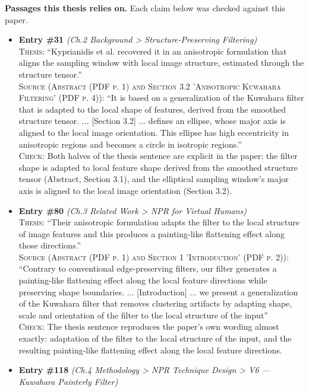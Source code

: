 \documentclass[11pt, a4paper]{article}
\begin{document}
\textbf{Passages this thesis relies on.} Each claim below was checked against this paper.
\begin{itemize}[leftmargin=1.2em,itemsep=4pt]
\item \textbf{Entry \#31} \textit{(Ch.2 Background > Structure-Preserving Filtering)}\\
\textsc{Thesis:} ``Kyprianidis et al. recovered it in an anisotropic formulation that aligns the sampling window with local image structure, estimated through the structure tensor.''\\
\textsc{Source (Abstract (PDF p. 1) and Section 3.2 'Anisotropic Kuwahara Filtering' (PDF p. 4)):} ``It is based on a generalization of the Kuwahara filter that is adapted to the local shape of features, derived from the smoothed structure tensor. ... [Section 3.2] ... defines an ellipse, whose major axis is aligned to the local image orientation. This ellipse has high eccentricity in anisotropic regions and becomes a circle in isotropic regions.''\\
\textsc{Check:} Both halves of the thesis sentence are explicit in the paper: the filter shape is adapted to local feature shape derived from the smoothed structure tensor (Abstract, Section 3.1), and the elliptical sampling window's major axis is aligned to the local image orientation (Section 3.2).
\item \textbf{Entry \#80} \textit{(Ch.3 Related Work > NPR for Virtual Humans)}\\
\textsc{Thesis:} ``Their anisotropic formulation adapts the filter to the local structure of image features and this produces a painting-like flattening effect along those directions.''\\
\textsc{Source (Abstract (PDF p. 1) and Section 1 'Introduction' (PDF p. 2)):} ``Contrary to conventional edge-preserving filters, our filter generates a painting-like flattening effect along the local feature directions while preserving shape boundaries. ... [Introduction] ... we present a generalization of the Kuwahara filter that removes clustering artifacts by adapting shape, scale and orientation of the filter to the local structure of the input''\\
\textsc{Check:} The thesis sentence reproduces the paper's own wording almost exactly: adaptation of the filter to the local structure of the input, and the resulting painting-like flattening effect along the local feature directions.
\item \textbf{Entry \#118} \textit{(Ch.4 Methodology > NPR Technique Design > V6 — Kuwahara Painterly Filter)}\\

\end{itemize}
\end{document}
